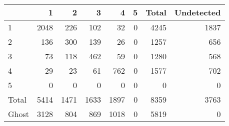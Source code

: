 \begin{tabular}{lrrrrrrr}
\toprule
 & 1 & 2 & 3 & 4 & 5 & Total & Undetected \\
\midrule
1 & 2048 & 226 & 102 & 32 & 0 & 4245 & 1837 \\
2 & 136 & 300 & 139 & 26 & 0 & 1257 & 656 \\
3 & 73 & 118 & 462 & 59 & 0 & 1280 & 568 \\
4 & 29 & 23 & 61 & 762 & 0 & 1577 & 702 \\
5 & 0 & 0 & 0 & 0 & 0 & 0 & 0 \\
Total & 5414 & 1471 & 1633 & 1897 & 0 & 8359 & 3763 \\
Ghost & 3128 & 804 & 869 & 1018 & 0 & 5819 & 0 \\
\bottomrule
\end{tabular}
